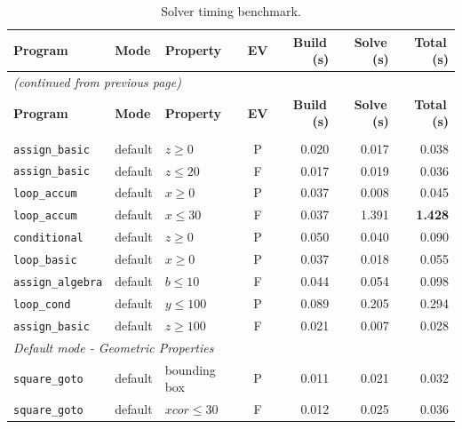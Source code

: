 \begin{longtable}{p{} p{} p{} c r r r}
\caption{Solver timing benchmark.}
\label{tab:timing} \\
\toprule
\textbf{Program} & \textbf{Mode} & \textbf{Property} & \textbf{EV} & \textbf{Build\,(s)} & \textbf{Solve\,(s)} & \textbf{Total\,(s)} \\
\midrule
\endfirsthead
\multicolumn{7}{l}{\small\itshape (continued from previous page)} \\
\toprule
\textbf{Program} & \textbf{Mode} & \textbf{Property} & \textbf{EV} & \textbf{Build\,(s)} & \textbf{Solve\,(s)} & \textbf{Total\,(s)} \\
\midrule
\endhead
\bottomrule
\endfoot
\bottomrule
\endlastfoot
\multicolumn{7}{l}{\textit{Default mode - Arithmetic Properties}} \\
\midrule
\texttt{assign\_basic}   & default & $z \geq 0$                          & P & 0.020 & 0.017 & 0.038 \\
\texttt{assign\_basic}   & default & $z \leq 20$                         & F & 0.017 & 0.019 & 0.036 \\
\texttt{loop\_accum}     & default & $x \geq 0$                          & P & 0.037 & 0.008 & 0.045 \\
\texttt{loop\_accum}     & default & $x \leq 30$                         & F & 0.037 & 1.391 & \textbf{1.428} \\
\texttt{conditional}     & default & $z \geq 0$                          & P & 0.050 & 0.040 & 0.090 \\
\texttt{loop\_basic}     & default & $x \geq 0$                          & P & 0.037 & 0.018 & 0.055 \\
\texttt{assign\_algebra} & default & $b \leq 10$                         & F & 0.044 & 0.054 & 0.098 \\
\texttt{loop\_cond}      & default & $y \leq 100$                        & P & 0.089 & 0.205 & 0.294 \\
\texttt{assign\_basic}   & default & $z \geq 100$                        & F & 0.021 & 0.007 & 0.028 \\
\midrule
\multicolumn{7}{l}{\textit{Default mode - Geometric Properties}} \\
\midrule
\texttt{square\_goto}    & default & bounding box                        & P & 0.011 & 0.021 & 0.032 \\
\texttt{square\_goto}    & default & $\mathit{xcor}\leq 30$              & F & 0.012 & 0.025 & 0.036 \\

\end{longtable}
